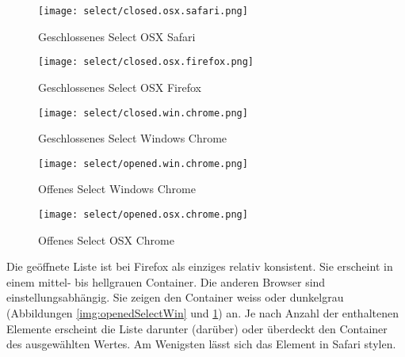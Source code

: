 \begin{figure}[!htb]
    \centering
    \begin{minipage}[b]{0.35\textwidth}
        \centering
        \begin{minipage}[t]{\textwidth}
            \centering
            \texttt{[image: select/closed.osx.safari.png]}
            \caption{\centering Geschlossenes Select OSX Safari}
            \label{img:closedSelectSafari}
        \end{minipage}
        \vspace{0.6cm}\newline
        \begin{minipage}[b]{\textwidth}
            \centering
            \texttt{[image: select/closed.osx.firefox.png]}
            \caption{\centering Geschlossenes Select OSX Firefox}
            \label{img:closedSelectFirefox}
        \end{minipage}
        \vspace{0.6cm}\newline
        \begin{minipage}[b]{\textwidth}
            \centering
            \texttt{[image: select/closed.win.chrome.png]}
            \caption{\centering Geschlossenes Select Windows Chrome}
            \label{img:closedSelectChrome}
        \end{minipage}
    \end{minipage}
    \hfill
    \begin{minipage}[b]{0.3\textwidth}
        \centering
        \texttt{[image: select/opened.win.chrome.png]}
        \caption{\centering Offenes Select Windows Chrome}
        \label{img:openedSelectWin}
    \end{minipage}
    \hfill
    \begin{minipage}[b]{0.2\textwidth}
        \centering
        \texttt{[image: select/opened.osx.chrome.png]}
        \caption{\centering Offenes Select OSX Chrome}
        \label{img:openedSelectOsx}
    \end{minipage}
\end{figure}

Die geöffnete Liste ist bei Firefox als einziges relativ konsistent. 
Sie erscheint in einem mittel- bis hellgrauen Container. 
Die anderen Browser sind einstellungsabhängig. 
Sie zeigen den Container weiss oder dunkelgrau (Abbildungen \ref{img:openedSelectWin} und \ref{img:openedSelectOsx}) an. 
Je nach Anzahl der enthaltenen Elemente erscheint die Liste darunter (darüber) oder überdeckt den Container des ausgewählten Wertes. 
Am Wenigsten lässt sich das Element in Safari stylen. 

